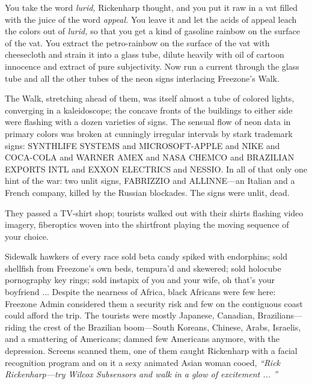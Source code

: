 You take the word \textit{lurid,} Rickenharp thought, and you put it raw in a vat filled with the juice of the word \textit{appeal.} You leave it and let the acids of appeal leach the colors out of \textit{lurid,} so that you get a kind of gasoline rainbow on the surface of the vat. You extract the petro-rainbow on the surface of the vat with cheesecloth and strain it into a glass tube, dilute heavily with oil of cartoon innocence and extract of pure subjectivity. Now run a current through the glass tube and all the other tubes of the neon signs interlacing Freezone's Walk.

The Walk, stretching ahead of them, was itself almost a tube of colored lights, converging in a kaleidoscope; the concave fronts of the buildings to either side were flashing with a dozen varieties of signs. The sensual flow of neon data in primary colors was broken at cunningly irregular intervals by stark trademark signs: SYNTHLIFE SYSTEMS and MICROSOFT-APPLE and NIKE and COCA-COLA and WARNER AMEX and NASA CHEMCO and BRAZILIAN EXPORTS INTL and EXXON ELECTRICS and NESSIO. In all of that only one hint of the war: two unlit signs, FABRIZZIO and ALLINNE---an Italian and a French company, killed by the Russian blockades. The signs were unlit, dead.

They passed a TV-shirt shop; tourists walked out with their shirts flashing video imagery, fiberoptics woven into the shirtfront playing the moving sequence of your choice.

Sidewalk hawkers of every race sold beta candy spiked with endorphins; sold shellfish from Freezone's own beds, tempura'd and skewered; sold holocube pornography key rings; sold instapix of you and your wife, oh that's your boyfriend ... Despite the nearness of Africa, black Africans were few here: Freezone Admin considered them a security risk and few on the contiguous coast could afford the trip. The tourists were mostly Japanese, Canadian, Brazilians---riding the crest of the Brazilian boom---South Koreans, Chinese, Arabs, Israelis, and a smattering of Americans; damned few Americans anymore, with the depression. Screens scanned them, one of them caught Rickenharp with a facial recognition program and on it a sexy animated Asian woman cooed, \textit{``Rick Rickenharp---try Wilcox Subsensors and walk in a glow of excitement ... ''}

